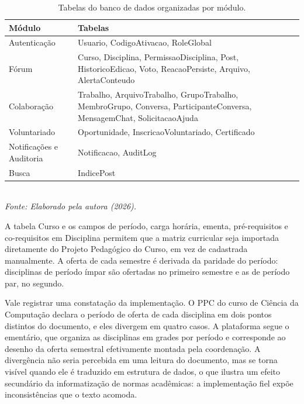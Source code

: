 \begin{table}[!ht]
\centering
\caption{Tabelas do banco de dados organizadas por módulo.}
\label{tab-banco}
\scriptsize
\begin{tabular}{|l|p{5.2cm}|}
\hline
\textbf{Módulo} & \textbf{Tabelas} \\
\hline
Autenticação & Usuario, CodigoAtivacao, RoleGlobal \\
\hline
Fórum & Curso, Disciplina, PermissaoDisciplina, Post, HistoricoEdicao, Voto, ReacaoPersiste, Arquivo, AlertaConteudo \\
\hline
Colaboração & Trabalho, ArquivoTrabalho, GrupoTrabalho, MembroGrupo, Conversa, ParticipanteConversa, MensagemChat, SolicitacaoAjuda \\
\hline
Voluntariado & Oportunidade, InscricaoVoluntariado, Certificado \\
\hline
Notificações e Auditoria & Notificacao, AuditLog \\
\hline
Busca & IndicePost \\
\hline
\end{tabular}
\\ \vspace{4pt}
\textit{\scriptsize Fonte: Elaborado pela autora (2026).}
\end{table}

A tabela Curso e os campos de período, carga horária, ementa, pré-requisitos e
co-requisitos em Disciplina permitem que a matriz curricular seja importada
diretamente do Projeto Pedagógico do Curso, em vez de cadastrada manualmente.
A oferta de cada semestre é derivada da paridade do período: disciplinas de
período ímpar são ofertadas no primeiro semestre e as de período par, no
segundo.

Vale registrar uma constatação da implementação. O PPC do curso de Ciência da
Computação declara o período de oferta de cada disciplina em dois pontos
distintos do documento, e eles divergem em quatro casos. A plataforma segue o
ementário, que organiza as disciplinas em grades por período e corresponde ao
desenho da oferta semestral efetivamente montada pela coordenação. A
divergência não seria percebida em uma leitura do documento, mas se torna
visível quando ele é traduzido em estrutura de dados, o que ilustra um efeito
secundário da informatização de normas acadêmicas: a implementação fiel expõe
inconsistências que o texto acomoda.

